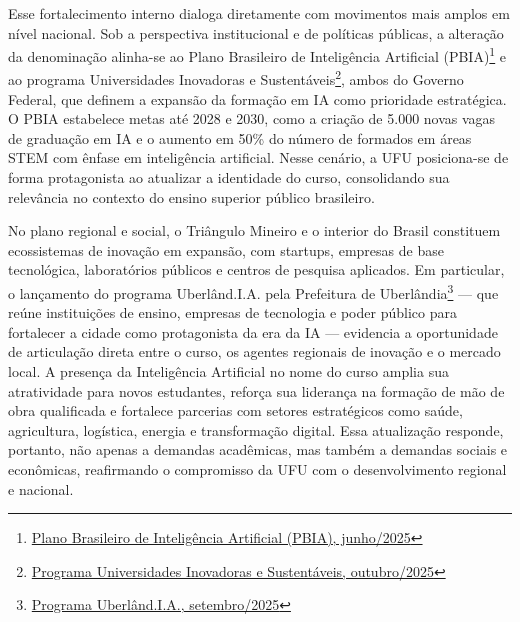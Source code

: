 Esse fortalecimento interno dialoga diretamente com movimentos mais amplos em nível nacional. Sob a perspectiva institucional e de políticas públicas, a alteração da denominação alinha-se ao Plano Brasileiro de Inteligência Artificial (PBIA)\footnote{\href{https://instituto.ia.lncc.br/pt/noticias/versao-final-plano-brasileiro-de-inteligencia-artificial-pbia}{Plano Brasileiro de Inteligência Artificial (PBIA), junho/2025}} e ao programa Universidades Inovadoras e Sustentáveis\footnote{\href{https://www.gov.br/fazenda/pt-br/assuntos/noticias/2025/outubro/programa-universidades-inovadoras-e-sustentaveis-e-lancado-em-parceria-com-o-mec-no-festival-curicaca}{Programa Universidades Inovadoras e Sustentáveis, outubro/2025}}, ambos do Governo Federal, que definem a expansão da formação em IA como prioridade estratégica. O PBIA estabelece metas até 2028 e 2030, como a criação de 5.000 novas vagas de graduação em IA e o aumento em 50\% do número de formados em áreas STEM com ênfase em inteligência artificial. Nesse cenário, a UFU posiciona-se de forma protagonista ao atualizar a identidade do curso, consolidando sua relevância no contexto do ensino superior público brasileiro.

No plano regional e social, o Triângulo Mineiro e o interior do Brasil constituem ecossistemas de inovação em expansão, com startups, empresas de base tecnológica, laboratórios públicos e centros de pesquisa aplicados. Em particular, o lançamento do programa Uberlând.I.A. pela Prefeitura de Uberlândia\footnote{\href{https://www.uberlandia.mg.gov.br/2025/09/04/prefeitura-promove-lancamento-do-programa-uberland-i-a/}{Programa Uberlând.I.A., setembro/2025}} — que reúne instituições de ensino, empresas de tecnologia e poder público para fortalecer a cidade como protagonista da era da IA — evidencia a oportunidade de articulação direta entre o curso, os agentes regionais de inovação e o mercado local. A presença da Inteligência Artificial no nome do curso amplia sua atratividade para novos estudantes, reforça sua liderança na formação de mão de obra qualificada e fortalece parcerias com setores estratégicos como saúde, agricultura, logística, energia e transformação digital. Essa atualização responde, portanto, não apenas a demandas acadêmicas, mas também a demandas sociais e econômicas, reafirmando o compromisso da UFU com o desenvolvimento regional e nacional.


